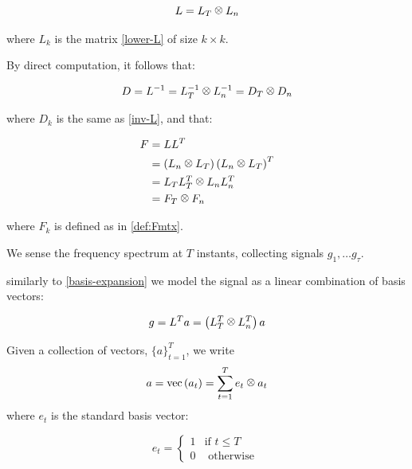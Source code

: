 \begin{definition}
\begin{equation}
L = L_T \kronecker L_n
\label{def:time-freq matrix}
\end{equation}

where \(L_k\) is the matrix \eqref{lower-L} of size \(k \times k\). 
\end{definition}

\begin{lemma}
By direct computation, it follows that:

\begin{equation}
D = L^{-1} = L_T^{-1} \kronecker L_n^{-1} = D_T \kronecker D_n
\end{equation}

where \(D_k\) is the same as \eqref{inv-L}, and that:

\begin{align}
F &= LL^T \\
&= \left(L_n \kronecker L_T\right)\left(L_n \kronecker L_T\right)^T\\
&=L_TL_T^T \kronecker L_nL_n^T \\
&= F_T \kronecker F_n
\end{align}

where \(F_k\) is defined as in \eqref{def:Fmtx}.
\end{lemma}

We sense the frequency spectrum at \(T\) instants, collecting signals \(g_1, \ldots g_\tau\). 

similarly to \ref{basis-expansion} we model the signal as a linear combination of basis vectors:

\begin{equation}
g = L^Ta = \left(L_T^T \kronecker L_n^T\right)a
\end{equation}

\begin{definition}
Given a collection of vectors, \(\{a\}_{t=1}^T\), we write
\begin{equation}
a = \mathrm{vec}\left(a_t\right) = \sum_{t=1}^T e_t \kronecker a_t
\end{equation}
where \(e_t\) is the standard basis vector:

\begin{equation}
e_t =
\begin{cases}
1 & \text{if } t \leq T \\
0 & \text{ otherwise } 
\end{cases}
\end{equation}

\end{definition}

